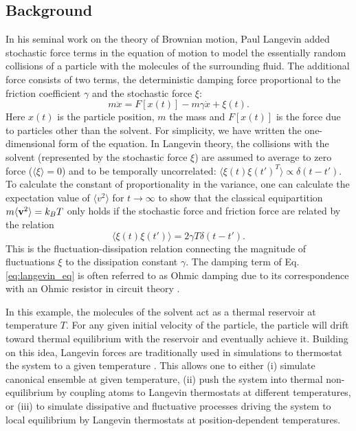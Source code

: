\subsection{Background}
In his seminal work on the theory of Brownian motion, Paul Langevin added stochastic force terms in the equation of motion to model the essentially random collisions of a particle with the molecules of the surrounding fluid. The additional force consists of two terms, the deterministic damping force proportional to the friction coefficient $\gamma$ and the stochastic force $\xi$:
\begin{equation}
 m \ddot{x} = {F}[{x}(t)] -m \gamma \dot{{x}} + \xi(t). \label{eq:langevin_eq}
\end{equation}
Here ${x}(t)$ is the particle position, $m$ the mass and ${F}[{x}(t)]$ is the force due to particles other than the solvent. For simplicity, we have written the one-dimensional form of the equation. In Langevin theory, the collisions with the solvent (represented by the stochastic force $\xi$) are assumed to average to zero force ($\langle \xi \rangle=0$) and to be temporally uncorrelated: $\langle \xi(t) \xi(t')^T\rangle \propto \delta(t-t')$. To calculate the constant of proportionality in the variance, one can calculate the expectation value of $\langle v^2\rangle$ for $t \to \infty$ to show that the classical equipartition $ m \langle \mathbf{v}^2 \rangle = k_BT$ only holds if the stochastic force and friction force are related by the relation
\begin{equation}
 \langle \xi(t) \xi(t')\rangle=2\gamma T \delta(t-t'). \label{eq:corr_ohmic} %
\end{equation}
This is the fluctuation-dissipation relation connecting the magnitude of fluctuations $\xi$ to the dissipation constant $\gamma$. The damping term of Eq. \eqref{eq:langevin_eq} is often referred to as Ohmic damping due to its correspondence with an Ohmic resistor in circuit theory \cite{weiss}.

In this example, the molecules of the solvent act as a thermal reservoir at temperature $T$. For any given initial velocity of the particle, the particle will drift toward thermal equilibrium with the reservoir and eventually achieve it. Building on this idea, Langevin forces are traditionally used in simulations to thermostat the system to a given temperature \cite{}. This allows one to either (i) simulate canonical ensemble at given temperature, (ii) push the system into thermal non-equilibrium by coupling atoms to Langevin thermostats at different temperatures, or (iii) to simulate dissipative and fluctuative processes driving the system to local equilibrium by Langevin thermostats at position-dependent temperatures.
\fi
\iffalse
